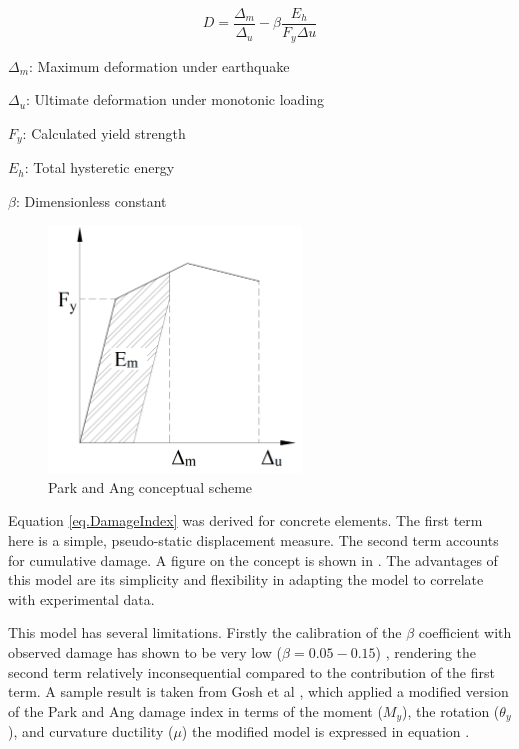 \begin{equation}
  D=\frac{\Delta_{m}}{\Delta_{u}}-\beta \frac{E_h}{F_{y}\Delta{u}}
  \label{eq.DamageIndex}
\end{equation} 

$\Delta_{m}$: Maximum deformation under earthquake

$\Delta_{u}$: Ultimate deformation under monotonic loading

$F_{y}$: Calculated yield strength

$E_{h}$: Total hysteretic energy

$\beta$: Dimensionless constant 

\begin{figure}[htbp]
\centering
\includegraphics[width=0.6\textwidth]{Chapter-2/figs/Park_and_Ang_Model}
\caption{Park and Ang conceptual scheme}
\label{fig:Paa}
\end{figure}

Equation \ref{eq.DamageIndex} was derived for concrete elements. The first term here is a simple, pseudo-static displacement measure. The second term accounts for cumulative damage. A figure on the concept is shown in . The advantages of this model are its simplicity and flexibility in adapting the model to correlate with experimental data.  

This model has several limitations. Firstly the calibration of the $\beta$ coefficient with observed damage has shown to be very low ($\beta=0.05-0.15$) \cite{Young-JiPark1985} \cite{Ghosh2015}, rendering the second term relatively inconsequential compared to the contribution of the first term. A sample result is taken from Gosh et al \cite{Ghosh2015}, which applied a modified version of the Park and Ang damage index in terms of the moment ($M_{y}$), the rotation ($\theta_y$), and curvature ductility ($\mu$) the modified model is expressed in equation .

